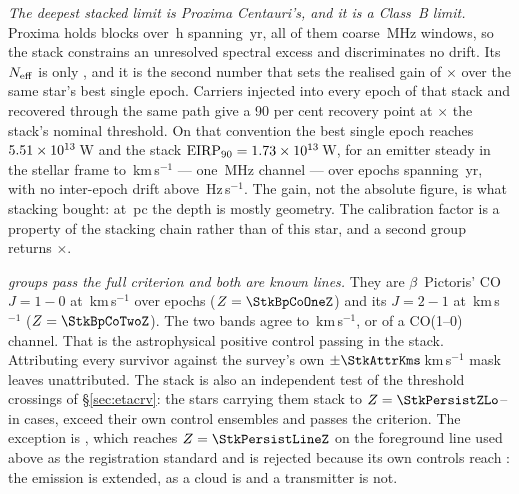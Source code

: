 \emph{The deepest stacked limit is Proxima Centauri's, and it is a Class~B
limit.} Proxima holds \StkProxN{} blocks over \StkProxHours\,h spanning
\StkProxSpanYr\,yr, all of them coarse \ChanBModeMHz\,MHz windows, so the
stack constrains an unresolved spectral excess and discriminates no drift.
Its $N_{\rm eff}$ is only \StkProxNeff, and it is the second number that
sets the realised gain of \StkProxGain$\times$ over the same star's best
single epoch. Carriers injected into every epoch of that stack and recovered
through the same path give a 90 per cent recovery point at
\StkCalMult$\times$ the stack's nominal threshold. On that convention the
best single epoch reaches $5.51 \times 10^{13}$\,W and the stack
$\mathrm{EIRP}_{90}=1.73\times10^{13}$\,W, for an emitter steady in the
stellar frame to \StkProxTolKms\,km\,s$^{-1}$ --- one \ChanBModeMHz\,MHz
channel --- over epochs spanning \StkProxSpanYr\,yr, with no inter-epoch
drift above \StkProxDriftHzS\,Hz\,s$^{-1}$. The gain, not the absolute
figure, is what stacking bought: at \StkProxDistPc\,pc the depth is mostly
geometry. The calibration factor is a property of the stacking chain rather
than of this star, and a second group returns \StkCalMultTwo$\times$.

\emph{\StkNSurvive{} groups pass the full criterion and both are known
lines.} They are
$\beta$~Pictoris' CO $J=1\!-\!0$ at \StkBpCoOneOff\,km\,s$^{-1}$ over
\StkBpCoOneN{} epochs ($Z=\StkBpCoOneZ$) and its $J=2\!-\!1$ at
\StkBpCoTwoOff\,km\,s$^{-1}$ ($Z=\StkBpCoTwoZ$). The two bands agree to
\StkBpCrossKms\,km\,s$^{-1}$, or \StkBpCrossChan{} of a CO(1--0) channel.
That is the astrophysical positive control passing in the stack. Attributing
every survivor against the survey's own $\pm\StkAttrKms$\,km\,s$^{-1}$ mask
leaves \StkNUnattributedComputed{} unattributed. The stack is also an
independent test of the threshold crossings of \S\ref{sec:etacrv}: the
\StkNPersistStar{} stars carrying them stack to
$Z=\StkPersistZLo$--\StkPersistZHi{} in \StkNPersistBelow{} cases,
\StkNPersistAboveCtrl{} exceed their own control ensembles and
\StkNPersistSurvive{} passes the criterion. The exception is
\StkPersistLineStar, which reaches $Z=\StkPersistLineZ$ on the foreground
line used above as the registration standard and is rejected because its own
controls reach \StkPersistLineCtrl: the emission is extended, as a cloud is
and a transmitter is not.

